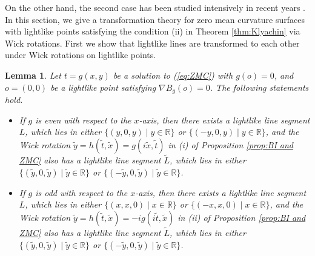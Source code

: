 \documentclass[12pt,amstex]{amsart}%
\theoremstyle{plain} %
\newtheorem{lemma}[theorem]{Lemma}
\theoremstyle{definition}
\begin{document}
On the other hand, the second case has been studied intensively in recent years \cite{A1,FujimoriETAL1,FujimoriETAL2,FujimoriETAL3,UY}. In this section, we give a transformation theory for zero mean curvature surfaces with lightlike points satisfying the condition (ii) in Theorem \ref{thm:Klyachin} via Wick rotations. First we show that lightlike lines are transformed to each other under Wick rotations on lightlike points.

\begin{lemma}Let $t=g(x,y)$ be a solution to (\ref{eq:ZMC}) with $g(o)=0$, and $o=(0,0)$ be a lightlike point satisfying $\nabla{B_g}(o)=0$. The following statements hold.
\begin{itemize}\label{Lemma:lightlikelines}
\item[(i)] If $g$ is even with respect to the $x$-axis, then there exists a lightlike line segment $L$, which lies in either $\{(y,0,y)\mid y\in \mathbb{R}\}$ or $\{(-y,0,y)\mid y\in \mathbb{R}\}$, and the Wick rotation $\tilde{y}=h(\tilde{t},\tilde{x})=g(i\tilde{x},\tilde{t})$ in (i) of Proposition \ref{prop:BI and ZMC} also has a lightlike line segment $\tilde{L}$, which lies in either $\{(\tilde{y},0,\tilde{y})\mid \tilde{y}\in \mathbb{R}\}$ or $\{(-\tilde{y},0,\tilde{y})\mid \tilde{y}\in \mathbb{R}\}$.
\item[(ii)] If $g$ is odd with respect to the $x$-axis, then there exists a lightlike line segment $L$, which lies in either $\{(x,x,0)\mid x\in \mathbb{R}\}$ or $\{(-x,x,0)\mid x\in \mathbb{R}\}$, and the Wick rotation $\tilde{y}=h(\tilde{t},\tilde{x})=-ig(i\tilde{t},\tilde{x})$ in (ii) of Proposition \ref{prop:BI and ZMC} also has a lightlike line segment $\tilde{L}$, which lies in either $\{(\tilde{y},0,\tilde{y})\mid \tilde{y}\in \mathbb{R}\}$ or $\{(-\tilde{y},0,\tilde{y})\mid \tilde{y}\in \mathbb{R}\}$.
\end{itemize}
\end{lemma}
\end{document}
